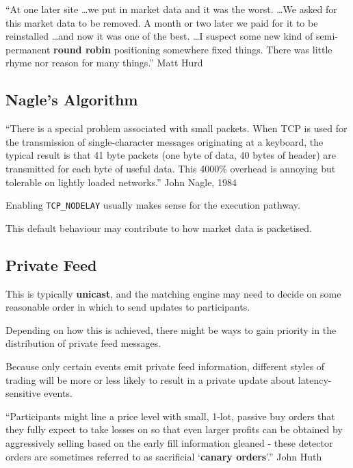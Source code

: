 \documentclass{article}
\begin{document}
\begin{block}{}
	``At one later site \ldots we put in market data and it was the worst. \ldots We asked for this market data to be removed. A month or two later we paid for it to be reinstalled \ldots and now it was one of the best. \ldots I suspect some new kind of semi-permanent \textbf{round robin} positioning somewhere fixed things. There was little rhyme nor reason for many things.'' Matt Hurd
\end{block}

\subsection{Nagle's Algorithm}
\begin{block}{}
	``There is a special problem associated with small packets. When TCP is used for the transmission of single-character messages originating at a keyboard, the typical result is that 41 byte packets (one byte of data, 40 bytes of header) are transmitted for each byte of useful data. This 4000\% overhead is annoying but tolerable on lightly loaded networks.'' John Nagle, 1984
\end{block}

Enabling \texttt{TCP\_NODELAY} usually makes sense for the execution pathway.

This default behaviour may contribute to how market data is packetised.

\subsection{Private Feed}
This is typically \textbf{unicast}, and the matching engine may need to decide on some reasonable order in which to send updates to participants.

Depending on how this is achieved, there might be ways to gain priority in the distribution of private feed messages.

Because only certain events emit private feed information, different styles of trading will be more or less likely to result in a private update about latency-sensitive events.

\begin{block}{}
	``Participants might line a price level with small, 1-lot, passive buy orders that they fully expect to take losses on so that even larger profits can be obtained by aggressively selling based on the early fill information gleaned - these detector orders are sometimes referred to as sacrificial `\textbf{canary orders}'.'' John Huth
\end{block}
\end{document}

